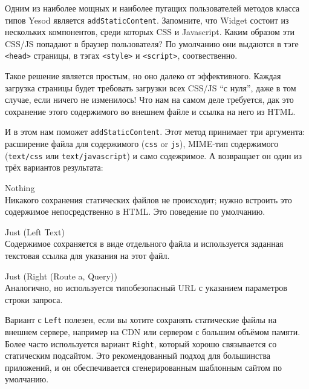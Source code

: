 Одним из наиболее мощных и наиболее пугащих пользователей методов класса типов Yesod является \lstinline!addStaticContent!. Запомните, что Widget состоит из нескольких компонентов, среди которых CSS и Javascript. Каким образом эти CSS/JS попадают в браузер пользователя? По умолчанию они выдаются в тэге \lstinline!<head>! страницы, в тэгах \lstinline!<style>! и \lstinline!<script>!, соотвественно.

Такое решение является простым, но оно далеко от эффективного. Каждая загрузка страницы будет требовать загрузки всех CSS/JS ``с нуля'', даже в том случае, если ничего не изменилось! Что нам на самом деле требуется, дак это сохранение этого содержимого во внешнем файле и ссылка на него из HTML.

И в этом нам поможет \lstinline!addStaticContent!. Этот метод принимает три аргумента: расширение файла для содержимого (\lstinline!css! or \lstinline!js!), MIME-тип содержимого (\lstinline!text/css! или \lstinline!text/javascript!) и само содежримое. А возвращает он один из трёх вариантов результата:

\begin{description}
  \item {Nothing}  \hfill \\
    Никакого сохранения статических файлов не происходит; нужно встроить это содержимое непосредственно в HTML. Это поведение по умолчанию.
  \item {Just (Left Text)} \hfill \\
    Содержимое сохраняется в виде отдельного файла и используется заданная текстовая ссылка для указания на этот файл.
  \item {Just (Right (Route a, Query))} \hfill \\
    Аналогично, но используется типобезопасный URL с указанием параметров строки запроса.
\end{description}

Вариант с \lstinline!Left! полезен, если вы хотите сохранять статические файлы на внешнем сервере, например на CDN или сервером с большим объёмом памяти. Более часто используется вариант \lstinline!Right!, который хорошо связывается со статическим подсайтом. Это рекомендованный подход для большинства приложений, и он обеспечивается сгенерированным шаблонным сайтом по умолчанию.



